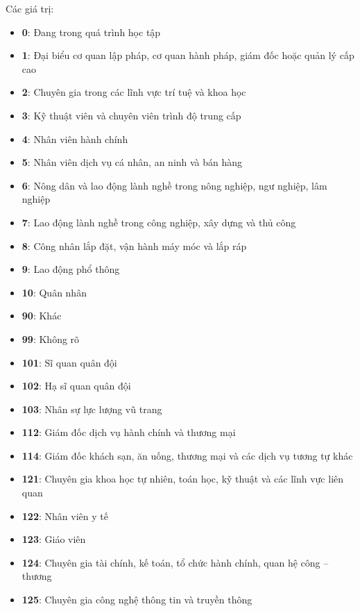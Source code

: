 \begin{itemize}
\begin{enumerate}
            Các giá trị:
            \begin{itemize}
              \item \textbf{0}: Đang trong quá trình học tập
              \item \textbf{1}: Đại biểu cơ quan lập pháp, cơ quan hành pháp, giám đốc hoặc quản lý cấp cao
              \item \textbf{2}: Chuyên gia trong các lĩnh vực trí tuệ và khoa học
              \item \textbf{3}: Kỹ thuật viên và chuyên viên trình độ trung cấp
              \item \textbf{4}: Nhân viên hành chính
              \item \textbf{5}: Nhân viên dịch vụ cá nhân, an ninh và bán hàng
              \item \textbf{6}: Nông dân và lao động lành nghề trong nông nghiệp, ngư nghiệp, lâm nghiệp
              \item \textbf{7}: Lao động lành nghề trong công nghiệp, xây dựng và thủ công
              \item \textbf{8}: Công nhân lắp đặt, vận hành máy móc và lắp ráp
              \item \textbf{9}: Lao động phổ thông
              \item \textbf{10}: Quân nhân
              \item \textbf{90}: Khác
              \item \textbf{99}: Không rõ
              \item \textbf{101}: Sĩ quan quân đội
              \item \textbf{102}: Hạ sĩ quan quân đội
              \item \textbf{103}: Nhân sự  lực lượng vũ trang
              \item \textbf{112}: Giám đốc dịch vụ hành chính và thương mại
              \item \textbf{114}: Giám đốc khách sạn, ăn uống, thương mại và các dịch vụ tương tự khác
              \item \textbf{121}: Chuyên gia khoa học tự nhiên, toán học, kỹ thuật và các lĩnh vực liên quan
              \item \textbf{122}: Nhân viên y tế
              \item \textbf{123}: Giáo viên
              \item \textbf{124}: Chuyên gia tài chính, kế toán, tổ chức hành chính, quan hệ công – thương
              \item \textbf{125}: Chuyên gia công nghệ thông tin và truyền thông

\end{itemize}
\end{enumerate}
\end{itemize}
